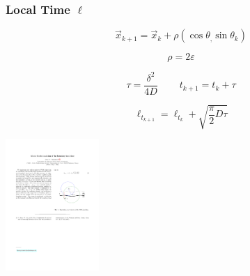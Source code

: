 \documentclass[9pt]{beamer}
\newcommand{\tens}{\ \ \ \ \ \ \ \ \ \ }
\newcommand{\tbf}{\textbf}
\newcommand{\veps}{\varepsilon}
\newcommand{\dlt}{\delta}
\newcommand{\tta}{\theta}
\begin{document}
\begin{frame}[noframenumbering]
	\frametitle{\tbf{Local Time} $\ell$}
	
  \begin{minipage}{0.45\linewidth}
  $$ \vec{x}_{k+1} = \vec{x}_k + \rho(\cos\tta_, \sin\tta_k) $$
  
  $$ \rho = 2\veps $$
  
  $$ \tau = \frac{\dlt^2}{4D} \tens t_{k+1} = t_k + \tau $$
  
  $$ \ell_{t_{k+1}} = \ell_{t_k} + \sqrt{\frac{\pi}{2} D \tau} $$
  
  \end{minipage}
  \begin{minipage}{0.5\linewidth}
  	\includegraphics[height=5cm]{figs/simu_reflect.pdf}
  \end{minipage}
	
\end{frame}
\end{document}
